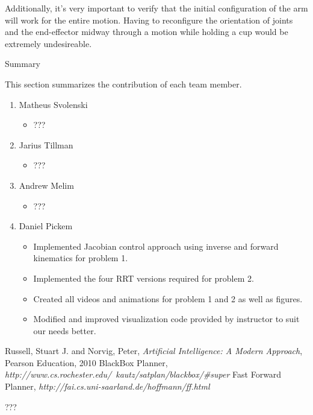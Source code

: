 \documentclass[12pt]{article}
\begin{document}
Additionally, it's very important to verify that the initial configuration of the arm will work for the entire motion. Having to reconfigure the orientation of joints and the end-effector midway through a motion while holding a cup would be extremely undesireable.

\newpage
\begin{center}
\Huge{Summary} 
\end{center}
This section summarizes the contribution of each team member. 

\begin{enumerate}
  \item Matheus Svolenski
    \begin{itemize}
     \item ???
    \end{itemize}

  \item Jarius Tillman
   \begin{itemize}
     \item ???
    \end{itemize}
  \item Andrew Melim
    \begin{itemize}
     \item ???
    \end{itemize}

  \item Daniel Pickem
    \begin{itemize}
     \item Implemented Jacobian control approach using inverse and forward kinematics for problem 1.
     \item Implemented the four RRT versions required for problem 2.
     \item Created all videos and animations for problem 1 and 2 as well as figures.
     \item Modified and improved visualization code provided by instructor to suit our needs better. 
    \end{itemize}
\end{enumerate}

\begin{thebibliography}{50}
   Russell, Stuart J. and Norvig, Peter, \textsl{Artificial Intelligence: A Modern Approach}, Pearson Education, 2010
   BlackBox Planner, \textsl{http://www.cs.rochester.edu/~kautz/satplan/blackbox/\#super}
   Fast Forward Planner, \textsl{http://fai.cs.uni-saarland.de/hoffmann/ff.html}
\end{thebibliography}

\newpage
\begin{appendix}
???
\end{appendix}

\newpage
\end{document}
